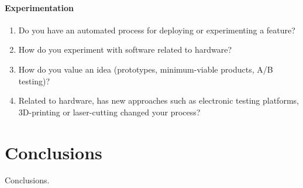 \documentclass[english]{tktltiki2}
\begin{document}
\paragraph{Experimentation}

\begin{enumerate}[resume]

    \item Do you have an automated process for deploying or experimenting a feature?
    \item How do you experiment with software related to hardware?
    \item How do you value an idea (prototypes, minimum-viable products, A/B testing)?
    \item Related to hardware, has new approaches such as electronic testing platforms, 3D-printing or laser-cutting changed your process?

\end{enumerate}


\section{Conclusions}

Conclusions.




\end{document}
